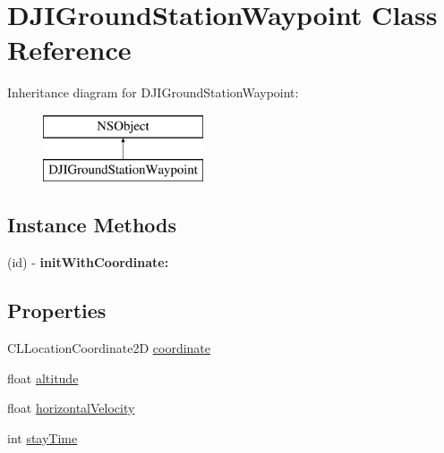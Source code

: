 \hypertarget{interface_d_j_i_ground_station_waypoint}{\section{D\+J\+I\+Ground\+Station\+Waypoint Class Reference}
\label{interface_d_j_i_ground_station_waypoint}
}
Inheritance diagram for D\+J\+I\+Ground\+Station\+Waypoint\+:\begin{figure}[H]
\begin{center}
\leavevmode
\includegraphics[height=2.000000cm]{interface_d_j_i_ground_station_waypoint}
\end{center}
\end{figure}
\subsection*{Instance Methods}
\begin{DoxyCompactItemize}
\item 
\hypertarget{interface_d_j_i_ground_station_waypoint_a40abddf2f95fb0d9a460ef288a3c2637}{(id) -\/ {\bfseries init\+With\+Coordinate\+:}}\label{interface_d_j_i_ground_station_waypoint_a40abddf2f95fb0d9a460ef288a3c2637}

\end{DoxyCompactItemize}
\subsection*{Properties}
\begin{DoxyCompactItemize}
\item 
C\+L\+Location\+Coordinate2\+D \hyperlink{interface_d_j_i_ground_station_waypoint_a40261f153c4a5cc55158cec8d45cfce1}{coordinate}
\item 
float \hyperlink{interface_d_j_i_ground_station_waypoint_a455e76a89605973616fcb7dd3f9944f9}{altitude}
\item 
float \hyperlink{interface_d_j_i_ground_station_waypoint_a173aad3e3662ad891f33015b1dc5e549}{horizontal\+Velocity}
\item 
int \hyperlink{interface_d_j_i_ground_station_waypoint_af492d8fd1160afec55ba567bc9d40f5a}{stay\+Time}
\end{DoxyCompactItemize}


